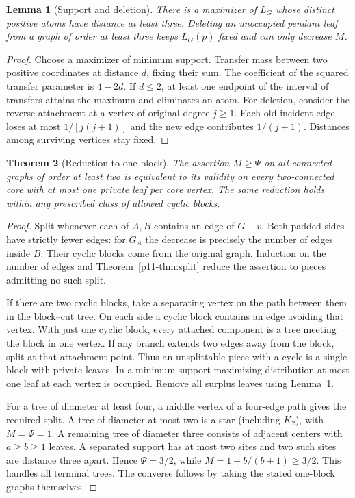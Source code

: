 \documentclass[11pt,a4paper]{article}
\newtheorem{theorem}{Theorem}[section]
\newtheorem{lemma}[theorem]{Lemma}\newtheorem{corollary}[theorem]{Corollary}
\begin{document}
\begin{lemma}[Support and deletion]\label{p11-lem:support}
There is a maximizer of $L_G$ whose distinct positive atoms have distance at least three. Deleting an unoccupied pendant leaf from a graph of order at least three keeps $L_G(p)$ fixed and can only decrease $M$.
\end{lemma}
\begin{proof}
Choose a maximizer of minimum support. Transfer mass between two positive coordinates at distance $d$, fixing their sum. The coefficient of the squared transfer parameter is $4-2d$. If $d\le2$, at least one endpoint of the interval of transfers attains the maximum and eliminates an atom. For deletion, consider the reverse attachment at a vertex of original degree $j\ge1$. Each old incident edge loses at most $1/[j(j+1)]$ and the new edge contributes $1/(j+1)$. Distances among surviving vertices stay fixed.
\end{proof}
\begin{theorem}[Reduction to one block]\label{p11-thm:reduction}
The assertion $M\ge\Psi$ on all connected graphs of order at least two is equivalent to its validity on every two-connected core with at most one private leaf per core vertex. The same reduction holds within any prescribed class of allowed cyclic blocks.
\end{theorem}
\begin{proof}
Split whenever each of $A,B$ contains an edge of $G-v$. Both padded sides have strictly fewer edges: for $G_A$ the decrease is precisely the number of edges inside $B$. Their cyclic blocks come from the original graph. Induction on the number of edges and Theorem~\ref{p11-thm:split} reduce the assertion to pieces admitting no such split.

If there are two cyclic blocks, take a separating vertex on the path between them in the block--cut tree. On each side a cyclic block contains an edge avoiding that vertex. With just one cyclic block, every attached component is a tree meeting the block in one vertex. If any branch extends two edges away from the block, split at that attachment point. Thus an unsplittable piece with a cycle is a single block with private leaves. In a minimum-support maximizing distribution at most one leaf at each vertex is occupied. Remove all surplus leaves using Lemma~\ref{p11-lem:support}.

For a tree of diameter at least four, a middle vertex of a four-edge path gives the required split. A tree of diameter at most two is a star (including $K_2$), with $M=\Psi=1$. A remaining tree of diameter three consists of adjacent centers with $a\ge b\ge1$ leaves. A separated support has at most two sites and two such sites are distance three apart. Hence $\Psi=3/2$, while $M=1+b/(b+1)\ge3/2$. This handles all terminal trees. The converse follows by taking the stated one-block graphs themselves.
\end{proof}
\end{document}
